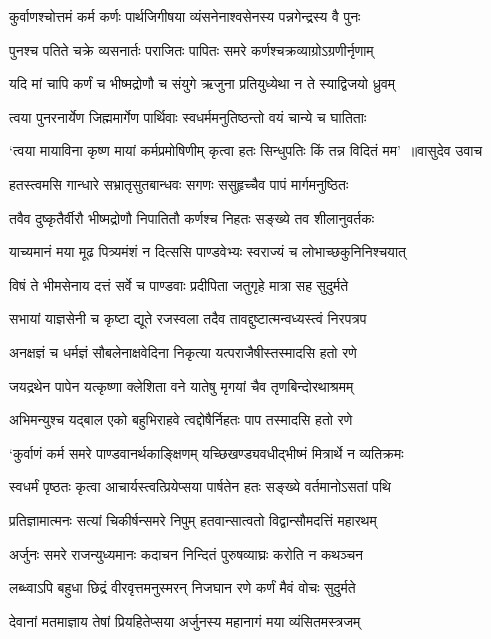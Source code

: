 \twolineshloka
{कुर्वाणश्चोत्तमं कर्म कर्णः पार्थजिगीषया}
{व्यंसनेनाश्वसेनस्य पन्नगेन्द्रस्य वै पुनः}


\twolineshloka
{पुनश्च पतिते चक्रे व्यसनार्तः पराजितः}
{पापितः समरे कर्णश्चक्रव्याग्रोऽग्रणीर्नृणाम्}


\twolineshloka
{यदि मां चापि कर्णं च भीष्मद्रोणौ च संयुगे}
{ऋजुना प्रतियुध्येथा न ते स्याद्विजयो ध्रुवम्}


\twolineshloka
{त्वया पुनरनार्येण जिह्ममार्गेण पार्थिवाः}
{स्वधर्ममनुतिष्ठन्तो वयं चान्ये च घातिताः}


\threelineshloka
{`त्वया मायाविना कृष्ण मायां कर्मप्रमोषिणीम्}
{कृत्वा हतः सिन्धुपतिः किं तन्न विदितं मम' ॥वासुदेव उवाच}
{}


\twolineshloka
{हतस्त्वमसि गान्धारे सभ्रातृसुतबान्धवः}
{सगणः ससुहृच्चैव पापं मार्गमनुष्ठितः}


\twolineshloka
{तवैव दुष्कृतैर्वीरौ भीष्मद्रोणौ निपातितौ}
{कर्णश्च निहतः सङ्ख्ये तव शीलानुवर्तकः}


\twolineshloka
{याच्यमानं मया मूढ पित्र्यमंशं न दित्ससि}
{पाण्डवेभ्यः स्वराज्यं च लोभाच्छकुनिनिश्चयात्}


\twolineshloka
{विषं ते भीमसेनाय दत्तं सर्वे च पाण्डवाः}
{प्रदीपिता जतुगृहे मात्रा सह सुदुर्मते}


\twolineshloka
{सभायां याज्ञसेनी च कृष्टा द्यूते रजस्वला}
{तदैव तावद्दुष्टात्मन्वध्यस्त्वं निरपत्रप}


\twolineshloka
{अनक्षज्ञं च धर्मज्ञं सौबलेनाक्षवेदिना}
{निकृत्या यत्पराजैषीस्तस्मादसि हतो रणे}


\twolineshloka
{जयद्रथेन पापेन यत्कृष्णा क्लेशिता वने}
{यातेषु मृगयां चैव तृणबिन्दोरथाश्रमम्}


\twolineshloka
{अभिमन्युश्च यद्बाल एको बहुभिराहवे}
{त्वद्दोषैर्निहतः पाप तस्मादसि हतो रणे}


\twolineshloka
{`कुर्वाणं कर्म समरे पाण्डवानर्थकाङ्क्षिणम्}
{यच्छिखण्ड्यवधीद्भीष्मं मित्रार्थे न व्यतिक्रमः}


\twolineshloka
{स्वधर्मं पृष्ठतः कृत्वा आचार्यस्त्वत्प्रियेप्सया}
{पार्षतेन हतः सङ्ख्ये वर्तमानोऽसतां पथि}


\twolineshloka
{प्रतिज्ञामात्मनः सत्यां चिकीर्षन्समरे निपुम्}
{हतवान्सात्वतो विद्वान्सौमदत्तिं महारथम्}


\twolineshloka
{अर्जुनः समरे राजन्युध्यमानः कदाचन}
{निन्दितं पुरुषव्याघ्रः करोति न कथञ्चन}


\twolineshloka
{लब्ध्वाऽपि बहुधा छिद्रं वीरवृत्तमनुस्मरन्}
{निजघान रणे कर्णं मैवं वोचः सुदुर्मते}


\twolineshloka
{देवानां मतमाज्ञाय तेषां प्रियहितेप्सया}
{अर्जुनस्य महानागं मया व्यंसितमस्त्रजम्}


